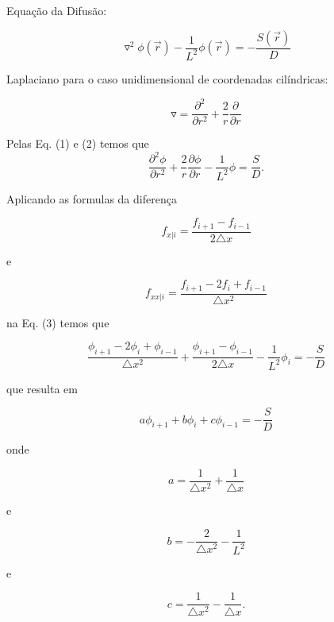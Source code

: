 \documentclass{article}
\begin{document}
  Equação da Difusão:

  \begin{equation}
      \triangledown^2 \phi (\vec r) - \frac{1}{L^2} \phi(\vec r) = - \frac{S(\vec r)}{D}
  \end{equation}

  Laplaciano para o caso unidimensional de coordenadas cilíndricas:

  \begin{equation}
      \triangledown =  \frac{\partial^2}{\partial r^2}  + \frac{2}{r} \frac{\partial}{\partial r}
  \end{equation}

  Pelas Eq. (1) e (2) temos que
  \begin{equation}
      \frac{\partial^2\phi}{\partial r^2}  + \frac{2}{r} \frac{\partial\phi}{\partial r} - \frac{1}{L^2} \phi = \frac{S}{D}.
  \end{equation}

  Aplicando as formulas da diferença

  \begin{equation}
      f_{x|i} = \frac{f_{i+1} - f_{i-1}}{2 \triangle x} 
  \end{equation}

  e

  \begin{equation}
      f_{xx|i} = \frac{f_{i+1} - 2 f_i + f_{i-1}}{\triangle x^2} 
  \end{equation}

  na Eq. (3) temos que

  \begin{equation}
      \frac{\phi_{i+1} - 2 \phi_i + \phi_{i-1}}{\triangle x^2} + \frac{\phi_{i+1} - \phi_{i-1}}{2 \triangle x} - \frac{1}{L^2} \phi_i = - \frac{S}{D}
  \end{equation}

  que resulta em

  \begin{equation}
      a \phi_{i+1} + b \phi_i + c \phi_{i-1} = - \frac{S}{D}
  \end{equation}

  onde

  \begin{equation}
      a = \frac{1}{\triangle x^2} + \frac{1}{\triangle x}
  \end{equation}

  e

  \begin{equation}
      b = -\frac{2}{\triangle x^2} - \frac{1}{L^2}
  \end{equation}

  e

  \begin{equation}
      c = \frac{1}{\triangle x^2} - \frac{1}{\triangle x}.
  \end{equation}
\end{document}
